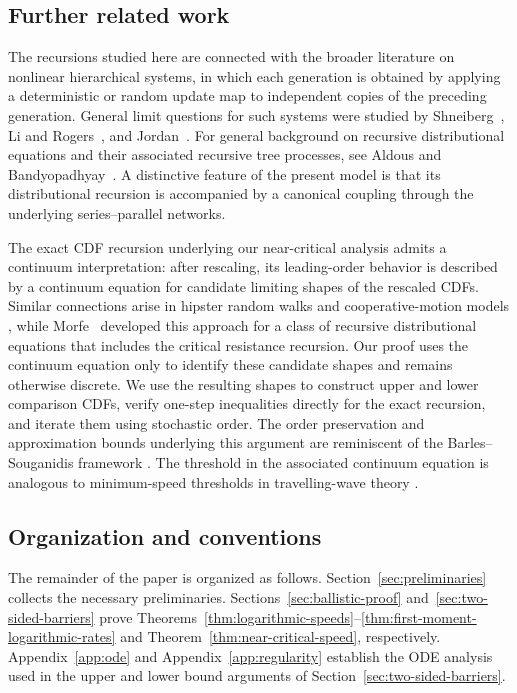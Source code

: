 \documentclass[a4paper,fleqn]{cas-sc}
\numberwithin{equation}{section}
\theoremstyle{plain}
\theoremstyle{definition}
\begin{document}
\subsection{Further related work}

The recursions studied here are connected with the broader literature on
nonlinear hierarchical systems, in which each generation is obtained by
applying a deterministic or random update map to independent copies of the
preceding generation.  General limit questions for such systems were studied
by Shneiberg~\cite{Shneiberg1986}, Li and Rogers~\cite{LiRogers1999}, and
Jordan~\cite{Jordan2002}.  For general background on recursive distributional
equations and their associated recursive tree processes, see Aldous and
Bandyopadhyay~\cite{AldousBandyopadhyay2005}.  A distinctive feature of the
present model is that its distributional recursion is accompanied by a
canonical coupling through the underlying series--parallel networks.

The exact CDF recursion underlying our near-critical analysis admits a
continuum interpretation: after rescaling, its leading-order behavior is
described by a continuum equation for candidate limiting shapes of the
rescaled CDFs.  Similar connections arise in hipster random walks and
cooperative-motion models
\cite{AddarioBerryEtAl2020,AddarioBerryBeckmanLin2022,
AddarioBerryBeckmanLin2024}, while Morfe~\cite{Morfe2026} developed this
approach for a class of recursive distributional equations that includes the
critical resistance recursion.  Our proof uses
the continuum equation
only to identify these candidate shapes and remains otherwise discrete.  We
use the resulting shapes to construct upper and lower comparison CDFs, verify
one-step inequalities directly for the exact recursion, and iterate them
using stochastic order.  The order preservation and approximation bounds
underlying this argument are reminiscent of the Barles--Souganidis framework
\cite{BarlesSouganidis1991}.  The threshold in the associated continuum
equation is analogous to minimum-speed thresholds in travelling-wave theory
\cite{HadelerRothe1975,SanchezGardunoMaini1994}.

\subsection{Organization and conventions}
\label{sec:organization-conventions}

The remainder of the paper is organized as follows.
Section~\ref{sec:preliminaries} collects the necessary preliminaries.
Sections~\ref{sec:ballistic-proof}
and~\ref{sec:two-sided-barriers} prove
Theorems~\ref{thm:logarithmic-speeds}--\ref{thm:first-moment-logarithmic-rates}
and Theorem~\ref{thm:near-critical-speed}, respectively.
Appendix~\ref{app:ode} and Appendix~\ref{app:regularity} establish the
ODE analysis used in the upper and lower bound arguments of Section~\ref{sec:two-sided-barriers}.
\end{document}
